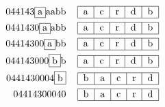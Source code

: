 \documentclass{article}
\begin{document}
\begin{align*}
\begin{tabular}{cr}
\begin{tabular}{|c|c|c|c|c|}
            \hline
        \end{tabular}
    \end{tabular} \\
    \begin{tabular}{cr}
        044143\framebox{a}aabb 
        & 
        \begin{tabular}{|c|c|c|c|c|}
            \hline
            a & c & r & d & b \\
            \hline
        \end{tabular}
    \end{tabular} \\
    \begin{tabular}{cr}
        0441430\framebox{a}abb 
        & 
        \begin{tabular}{|c|c|c|c|c|}
            \hline
            a & c & r & d & b \\
            \hline
        \end{tabular}
    \end{tabular} \\
    \begin{tabular}{cr}
        04414300\framebox{a}bb 
        & 
        \begin{tabular}{|c|c|c|c|c|}
            \hline
            a & c & r & d & b \\
            \hline
        \end{tabular}
    \end{tabular} \\
    \begin{tabular}{cr}
        044143000\framebox{b}b 
        & 
        \begin{tabular}{|c|c|c|c|c|}
            \hline
            a & c & r & d & b \\
            \hline
        \end{tabular}
    \end{tabular} \\
    \begin{tabular}{cr}
        0441430004\framebox{b} 
        & 
        \begin{tabular}{|c|c|c|c|c|}
            \hline
            b & a & c & r & d \\
            \hline
        \end{tabular}
    \end{tabular} \\
    \begin{tabular}{cr}
        04414300040
        & 
        \begin{tabular}{|c|c|c|c|c|}
            \hline
            b & a & c & r & d \\
            \hline
        \end{tabular}
    \end{tabular}
\end{align*}
\end{document}
